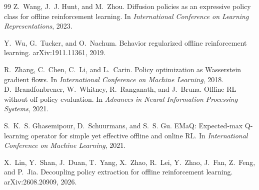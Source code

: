 \begin{thebibliography}{99}
Z.~Wang, J.~J. Hunt, and M.~Zhou.
\newblock Diffusion policies as an expressive policy class for offline reinforcement learning.
\newblock In \emph{International Conference on Learning Representations}, 2023.

Y.~Wu, G.~Tucker, and O.~Nachum.
\newblock Behavior regularized offline reinforcement learning.
\newblock arXiv:1911.11361, 2019.

R.~Zhang, C.~Chen, C.~Li, and L.~Carin.
\newblock Policy optimization as Wasserstein gradient flows.
\newblock In \emph{International Conference on Machine Learning}, 2018.
D.~Brandfonbrener, W.~Whitney, R.~Ranganath, and J.~Bruna.
\newblock Offline RL without off-policy evaluation.
\newblock In \emph{Advances in Neural Information Processing Systems}, 2021.

S.~K.~S. Ghasemipour, D.~Schuurmans, and S.~S. Gu.
\newblock EMaQ: Expected-max Q-learning operator for simple yet effective offline and online RL.
\newblock In \emph{International Conference on Machine Learning}, 2021.

X.~Lin, Y.~Shan, J.~Duan, T.~Yang, X.~Zhao, R.~Lei, Y.~Zhao, J.~Fan, Z.~Feng, and P.~Jia.
\newblock Decoupling policy extraction for offline reinforcement learning.
\newblock arXiv:2608.20909, 2026.

\end{thebibliography}
